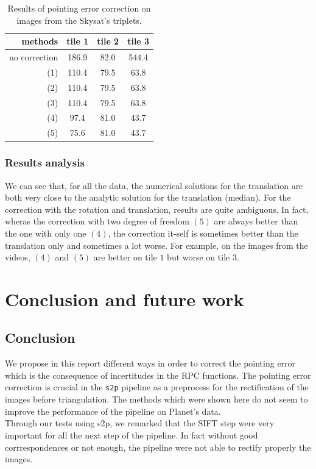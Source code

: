 \documentclass[paper=a4, fontsize=11pt, onecolumn, tikz, dvipsnames, svgnames, x11names]{article}
\begin{document}
        \begin{table}[h]
\centering
             \begin{tabular}{|r||c|c|c|}
              \hline
          methods &    tile 1 & tile 2 & tile 3 \\
              \hline
         no correction &    186.9& 82.0& 544.4 \\
             \hline
      (1) & 110.4& 79.5& 63.8\\
       (2) & 110.4& 79.5& 63.8\\
      (3) &  110.4& 79.5& 63.8\\
      (4) &  97.4& 81.0& 43.7\\
      (5) &  75.6& 81.0& 43.7\\
              \hline
            \end{tabular}
                            \caption{Results of pointing error correction on images from the Skysat's triplets.}
             \label{tab:triplet-res}
          \end{table}

     \subsubsection{Results analysis}

We can see that, for all the data, the numerical solutions for the translation are both very close to the analytic solution for the translation (median). For the correction with the rotation and translation, results are quite ambiguous. In fact, wheras the correction with two degree of freedom $(5)$ are always better than the one with only one $(4)$, the correction it-self is sometimes better than the translation only and sometimes a lot worse. For example, on the images from the videos, $(4)$ and $(5)$ are better on tile $1$ but worse on tile $3$.

\section{Conclusion and future work}

\subsection{Conclusion}
We propose in this report different ways in order to correct the pointing error which is the consequence of incertitudes in the RPC functions. The pointing error correction is crucial in the \verb|s2p| pipeline as a preprocess for the rectification of the images before triangulation. The methods which were shown here do not seem to improve the performance of the pipeline on Planet's data.\\
Through our tests using s2p, we remarked that the SIFT step were very important for all the next step of the pipeline. In fact without good corrrespondences or not enough, the pipeline were not able to rectify properly the images.
\end{document}
